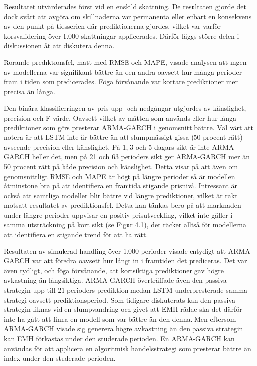 \documentclass[11pt]{article}
\numberwithin{equation}{section}
\numberwithin{table}{section}
\numberwithin{figure}{section}
\begin{document}
Resultatet utvärderades först vid en enskild skattning. De resultaten gjorde det dock svårt att avgöra om skillnaderna var permanenta eller enbart en konsekvens av den punkt på tidsserien där prediktionerna gjordes, vilket var varför korsvalidering över 1.000 skattningar applicerades. Därför läggs större delen i diskussionen åt att diskutera denna.

Rörande prediktionsfel, mätt med RMSE och MAPE, visade analysen att ingen av modellerna var signifikant bättre än den andra oavsett hur många perioder fram i tiden som predicerades. Föga förvånande var kortare prediktioner mer precisa än långa. 

Den binära klassificeringen av pris upp- och nedgångar utgjordes av känslighet, precision och F-värde. Oavsett vilket av måtten som används eller hur långa prediktioner som görs presterar ARMA-GARCH i genomsnitt bättre. Väl värt att notera är att LSTM inte är bättre än att slumpmässigt gissa (50 procent rätt) avseende precision eller känslighet. På 1, 3 och 5 dagars sikt är inte ARMA-GARCH heller det, men på 21 och 63 perioders sikt ger ARMA-GARCH mer än 50 procent rätt på både precision och känslighet. Detta visar på att även om genomsnittligt RMSE och MAPE är högt på längre perioder så är modellen åtminstone bra på att identifiera en framtida stigande prisnivå. Intressant är också att samtliga modeller blir bättre vid längre prediktioner, vilket är rakt motsatt resultatet av prediktionsfel. Detta kan tänkas bero på att marknaden under längre perioder uppvisar en positiv prisutveckling, vilket inte gäller i samma utsträckning på kort sikt (se Figur 4.1), det räcker alltså för modellerna att identifiera en stigande trend för att ha rätt.   

Resultaten av simulerad handling över 1.000 perioder visade entydigt att ARMA-GARCH var att föredra oavsett hur långt in i framtiden det prediceras. Det var även tydligt, och föga förvånande, att kortsiktiga prediktioner gav högre avkastning än långsiktiga. ARMA-GARCH överträffade även den passiva strategin upp till 21 perioders prediktion medan LSTM underpresterade samma strategi oavsett prediktionsperiod. Som tidigare diskuterats kan den passiva strategin liknas vid en slumpvandring och givet att EMH rådde ska det därför inte ha gått att finna en modell som var bättre än den denna. Men eftersom ARMA-GARCH visade sig generera högre avkastning än den passiva strategin kan EMH förkastas under den studerade perioden. En ARMA-GARCH kan användas för att applicera en algoritmisk handelsstrategi som presterar bättre än index under den studerade perioden.
\end{document}
